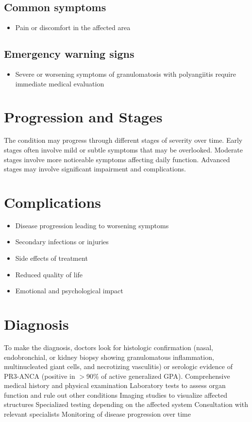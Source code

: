 \subsection{Common symptoms}
\begin{itemize}[noitemsep]
  \item Pain or discomfort in the affected area
  \end{itemize}

\subsection{Emergency warning signs}
\begin{itemize}[noitemsep]
  \item Severe or worsening symptoms of granulomatosis with polyangiitis require immediate medical evaluation
\end{itemize}
\section{Progression and Stages}
The condition may progress through different stages of severity over time. Early stages often involve mild or subtle symptoms that may be overlooked. Moderate stages involve more noticeable symptoms affecting daily function. Advanced stages may involve significant impairment and complications.
\section{Complications}
\begin{itemize}[noitemsep]
  \item Disease progression leading to worsening symptoms
  \item Secondary infections or injuries
  \item Side effects of treatment
  \item Reduced quality of life
  \item Emotional and psychological impact
\end{itemize}
\section{Diagnosis}
To make the diagnosis, doctors look for histologic confirmation (nasal, endobronchial, or kidney biopsy showing granulomatous inflammation, multinucleated giant cells, and necrotizing vasculitis) or serologic evidence of PR3-ANCA (positive in $>$90\% of active generalized GPA). Comprehensive medical history and physical examination Laboratory tests to assess organ function and rule out other conditions Imaging studies to visualize affected structures Specialized testing depending on the affected system Consultation with relevant specialists Monitoring of disease progression over time

